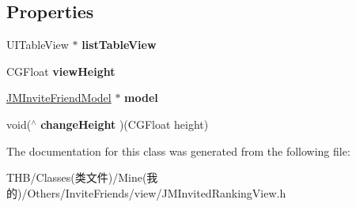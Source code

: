 \subsection*{Properties}
\begin{DoxyCompactItemize}
\item 
\mbox{\label{interface_j_m_invited_ranking_view_a6ffe16fcd86d967fc2f175a163014439}} 
U\+I\+Table\+View $\ast$ {\bfseries list\+Table\+View}
\item 
\mbox{\label{interface_j_m_invited_ranking_view_a8846487f2256b82aeb1e3cb9829b0895}} 
C\+G\+Float {\bfseries view\+Height}
\item 
\mbox{\label{interface_j_m_invited_ranking_view_a3bfa6f76e4f811021751012433b1e70f}} 
\mbox{\hyperlink{interface_j_m_invite_friend_model}{J\+M\+Invite\+Friend\+Model}} $\ast$ {\bfseries model}
\item 
\mbox{\label{interface_j_m_invited_ranking_view_a7ee9634cd905ac0c9f466b238310a395}} 
void($^\wedge$ {\bfseries change\+Height} )(C\+G\+Float height)
\end{DoxyCompactItemize}


The documentation for this class was generated from the following file\+:\begin{DoxyCompactItemize}
\item 
T\+H\+B/\+Classes(类文件)/\+Mine(我的)/\+Others/\+Invite\+Friends/view/J\+M\+Invited\+Ranking\+View.\+h\end{DoxyCompactItemize}
